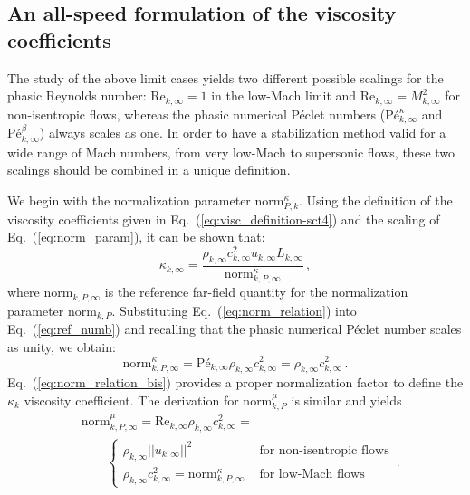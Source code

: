 \documentclass[preprint,10pt]{elsarticle}
\newcommand{\norm}{\textrm{norm}}
\renewcommand{\Re}{\textrm{Re}}
\newcommand{\Pe}{\textrm{P\'e}}
\newcommand{\eqt}[1]{Eq.~(\ref{#1})}                     %
\begin{document}
\subsection{An all-speed formulation of the viscosity coefficients}\label{eq:visc-formulation}
The study of the above limit cases yields two different possible scalings for the phasic Reynolds number: 
$\Re_{k,\infty} = 1$ in the low-Mach limit and $\Re_{k,\infty}  = M_{k,\infty}^2$ for non-isentropic flows, 
whereas the phasic numerical P\'eclet numbers ($\Pe_{k,\infty}^\kappa$ and $\Pe_{k,\infty}^\beta$) always scales as one. In order to have a stabilization method 
valid for a wide range of Mach numbers, from very low-Mach to supersonic flows, these two scalings should 
be combined in a unique definition. 

We begin with the  normalization parameter $\norm_{P,k}^\kappa$. Using the 
definition of the viscosity coefficients given in \eqt{eq:visc_definition-sct4} and the scaling of 
\eqt{eq:norm_param}, it can be shown that:
%
\begin{equation}
\label{eq:norm_relation}
\kappa_{k,\infty} = \frac{ \rho_{k,\infty} c_{k,\infty}^2 u_{k,\infty} L_{k,\infty} }{ \norm_{k,P,\infty}^{\kappa} } \, ,
\end{equation}
%
where $\norm_{k,P,\infty}$ is the reference far-field quantity for the normalization parameter $\norm_{k,P}$. 
Substituting \eqt{eq:norm_relation} into \eqt{eq:ref_numb} and recalling that the phasic numerical P\'eclet 
number scales as unity, we obtain:
%
\begin{equation}
\label{eq:norm_relation_bis}
\norm_{k,P,\infty}^{\kappa} = \Pe_{k,\infty} \rho_{k,\infty} c_{k,\infty}^2 = \rho_{k,\infty} c_{k,\infty}^2 \, .
\end{equation}
%
\eqt{eq:norm_relation_bis} provides a proper normalization factor to define the $\kappa_k$ viscosity coefficient.
%
The derivation for $\norm_{k,P}^\mu$ is similar and yields
\begin{align}
\label{eq:norm_ent2}
&\norm_{k,P,\infty}^\mu = \Re_{k,\infty} \rho_{k,\infty} c_{k,\infty}^2 =  \nonumber \\ 
& \ \ \ \ \ \ \ \ \ \left\{
\begin{array}{ll}
 \rho_{k,\infty} ||u_{k,\infty} ||^2       & \text{ for non-isentropic flows} \\
 \rho_{k,\infty} c_{k,\infty}^2 = \norm_{k,P,\infty}^\kappa & \text{ for low-Mach flows}
\end{array}
\right. \,.
\end{align}
\end{document}
